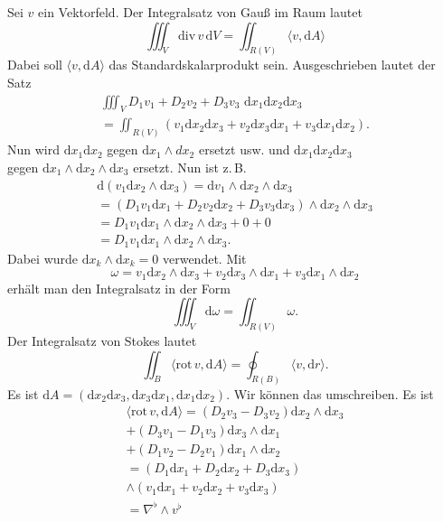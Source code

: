 \documentclass[a4paper,10pt,fleqn,twocolumn,twoside]{article}
\numberwithin{equation}{section}
\begin{document}
%
Sei $v$ ein Vektorfeld. Der Integralsatz von Gauß im Raum lautet
\begin{equation}
\iiint_V \mathrm{div}\,v\,\mathrm dV
= \iint_{R(V)} \langle v,\mathrm dA\rangle
\end{equation}
Dabei soll $\langle v,\mathrm dA\rangle$ das Standardskalarprodukt
sein. Ausgeschrieben lautet der Satz
\begin{gather*}
\iiint_V D_1v_1+D_2v_2+D_3v_3\,\,\mathrm dx_1\mathrm dx_2\mathrm dx_3\\
= \iint_{R(V)}(v_1\mathrm dx_2\mathrm dx_3+v_2\mathrm dx_3\mathrm dx_1
+v_3 \mathrm dx_1\mathrm dx_2).
\end{gather*}
Nun wird $\mathrm dx_1\mathrm dx_2$ gegen
$\mathrm dx_1\wedge dx_2$ ersetzt usw. und
$\mathrm dx_1\mathrm dx_2\mathrm dx_3$\\
gegen $\mathrm dx_1\wedge\mathrm dx_2\wedge\mathrm dx_3$
ersetzt. Nun ist z.\,B.
\begin{gather*}\mathrm d(v_1\mathrm dx_2\wedge\mathrm dx_3)
= \mathrm dv_1\wedge\mathrm dx_2\wedge\mathrm dx_3\\
= (D_1v_1\mathrm dx_1+D_2v_2\mathrm dx_2+D_3v_3\mathrm dx_3)
\wedge\mathrm dx_2\wedge\mathrm dx_3\\
= D_1v_1\mathrm dx_1\wedge\mathrm dx_2\wedge\mathrm dx_3+0+0\\
= D_1v_1\mathrm dx_1\wedge\mathrm dx_2\wedge\mathrm dx_3.
\end{gather*}
Dabei wurde $\mathrm dx_k\wedge\mathrm dx_k=0$ verwendet.
Mit
\begin{equation}
\omega = v_1\mathrm dx_2\wedge\mathrm dx_3
+v_2\mathrm dx_3\wedge\mathrm dx_1
+v_3\mathrm dx_1\wedge\mathrm dx_2
\end{equation}
erhält man den Integralsatz in der Form
\begin{equation}
\iiint_V \mathrm d\omega = \iint_{R(V)} \omega.
\end{equation}
Der Integralsatz von Stokes lautet
\begin{equation}
\iint_B \langle\mathrm{rot}\,v,\mathrm dA\rangle
= \oint_{R(B)} \langle v,\mathrm dr\rangle.
\end{equation}
Es ist
$\mathrm dA = (\mathrm dx_2\mathrm dx_3,\mathrm dx_3\mathrm dx_1,
\mathrm dx_1\mathrm dx_2)$.
Wir können das umschreiben. Es ist
\begin{gather*}
\langle\mathrm{rot}\,v,\mathrm dA\rangle
= (D_2v_3-D_3v_2)\mathrm dx_2\wedge\mathrm dx_3\\
+ (D_3v_1-D_1v_3)\mathrm dx_3\wedge\mathrm dx_1\\
+ (D_1v_2-D_2v_1)\mathrm dx_1\wedge\mathrm dx_2\\
= (D_1\mathrm dx_1+D_2\mathrm dx_2+D_3\mathrm dx_3)\\
\wedge (v_1\mathrm dx_1+v_2\mathrm dx_2+v_3\mathrm dx_3)\\
= \nabla^\flat\wedge v^\flat
\end{gather*}
\end{document}
